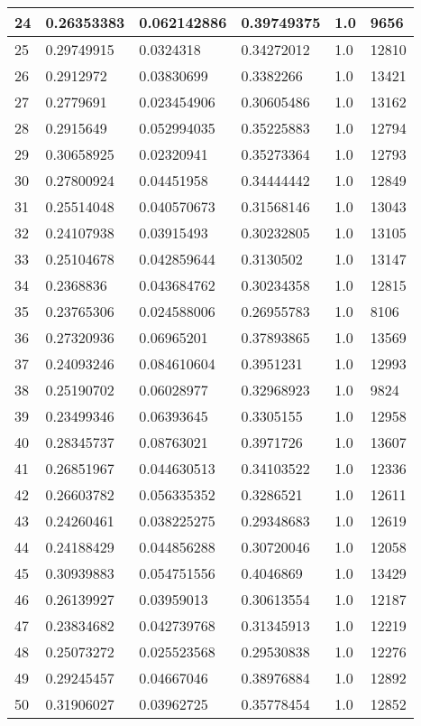 \begin{longtable}{|l|l|l|l|l|l|}
24 & 0.26353383 & 0.062142886 & 0.39749375 & 1.0 & 9656 \\ \hline 
25 & 0.29749915 & 0.0324318 & 0.34272012 & 1.0 & 12810 \\ \hline 
26 & 0.2912972 & 0.03830699 & 0.3382266 & 1.0 & 13421 \\ \hline 
27 & 0.2779691 & 0.023454906 & 0.30605486 & 1.0 & 13162 \\ \hline 
28 & 0.2915649 & 0.052994035 & 0.35225883 & 1.0 & 12794 \\ \hline 
29 & 0.30658925 & 0.02320941 & 0.35273364 & 1.0 & 12793 \\ \hline 
30 & 0.27800924 & 0.04451958 & 0.34444442 & 1.0 & 12849 \\ \hline 
31 & 0.25514048 & 0.040570673 & 0.31568146 & 1.0 & 13043 \\ \hline 
32 & 0.24107938 & 0.03915493 & 0.30232805 & 1.0 & 13105 \\ \hline 
33 & 0.25104678 & 0.042859644 & 0.3130502 & 1.0 & 13147 \\ \hline 
34 & 0.2368836 & 0.043684762 & 0.30234358 & 1.0 & 12815 \\ \hline 
35 & 0.23765306 & 0.024588006 & 0.26955783 & 1.0 & 8106 \\ \hline 
36 & 0.27320936 & 0.06965201 & 0.37893865 & 1.0 & 13569 \\ \hline 
37 & 0.24093246 & 0.084610604 & 0.3951231 & 1.0 & 12993 \\ \hline 
38 & 0.25190702 & 0.06028977 & 0.32968923 & 1.0 & 9824 \\ \hline 
39 & 0.23499346 & 0.06393645 & 0.3305155 & 1.0 & 12958 \\ \hline 
40 & 0.28345737 & 0.08763021 & 0.3971726 & 1.0 & 13607 \\ \hline 
41 & 0.26851967 & 0.044630513 & 0.34103522 & 1.0 & 12336 \\ \hline 
42 & 0.26603782 & 0.056335352 & 0.3286521 & 1.0 & 12611 \\ \hline 
43 & 0.24260461 & 0.038225275 & 0.29348683 & 1.0 & 12619 \\ \hline 
44 & 0.24188429 & 0.044856288 & 0.30720046 & 1.0 & 12058 \\ \hline 
45 & 0.30939883 & 0.054751556 & 0.4046869 & 1.0 & 13429 \\ \hline 
46 & 0.26139927 & 0.03959013 & 0.30613554 & 1.0 & 12187 \\ \hline 
47 & 0.23834682 & 0.042739768 & 0.31345913 & 1.0 & 12219 \\ \hline 
48 & 0.25073272 & 0.025523568 & 0.29530838 & 1.0 & 12276 \\ \hline 
49 & 0.29245457 & 0.04667046 & 0.38976884 & 1.0 & 12892 \\ \hline 
50 & 0.31906027 & 0.03962725 & 0.35778454 & 1.0 & 12852 \\ \hline 
\end{longtable}